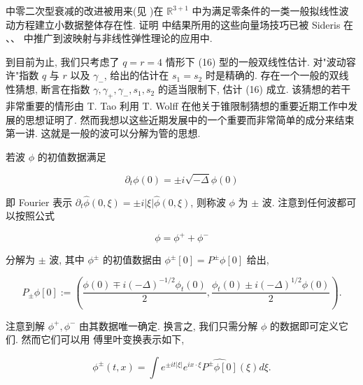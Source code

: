 \begin{remark}\label{rem:cG-1.24}
 中零二次型衰减的改进被用来(见 \cite{gfref28})在 $\mathbb{R}^{3 + 1}$ 中为满足零条件的一类一般拟线性波动方程建立小数据整体存在性. 证明 \cite{gfref28} 中结果所用的这些向量场技巧已被 Sideris 在 \cite{gfref63}、\cite{gfref64}、\cite{gfref65} 中推广到波映射与非线性弹性理论的应用中. 
\end{remark}

到目前为止, 我们只考虑了 $q = r = 4$ 情形下 (16) 型的一般双线性估计. 对"波动容许"指数 $q$ 与 $r$ 以及 $\gamma_{-}$,  给出的估计在 $s_{1} = s_{2}$ 时是精确的. 存在一个一般的双线性猜想, 断言在指数 $\gamma, \gamma_{+}, \gamma_{-}, s_{1}, s_{2}$ 的适当限制下, 估计 (16) 成立. 该猜想的若干非常重要的情形由 T. Tao \cite{gfref68} 利用 T. Wolff \cite{gfref76} 在他关于锥限制猜想的重要近期工作中发展的思想证明了. 然而我想以这些近期发展中的一个重要而非常简单的成分来结束第一讲. 这就是一般的波可以分解为管的思想. 

\begin{definition}\label{def:cG-1.25}
若波 $\phi$ 的初值数据满足

\[
\partial_ {t} \phi (0) = \pm i \sqrt {- \Delta} \phi (0)
\]

即 Fourier 表示 $\partial_t\widehat{\phi}(0, \xi) = \pm i|\xi |\widehat{\phi}(0, \xi)$, 则称波 $\phi$ 为 $\pm$ 波. 注意到任何波都可以按照公式

\[
\phi = \phi^ {+} + \phi^ {-}
\]

分解为 $\pm$ 波, 其中 $\phi^{\pm}$ 的初值数据由 $\phi^{\pm}[0] = P^{\pm}\phi [0]$ 给出, 

\[
P _ {\pm} \phi [ 0 ] := \left(\frac {\phi (0) \mp i (- \Delta) ^ {- 1 / 2} \phi_ {t} (0)}{2},  \frac {\phi_ {t} (0) \pm i (- \Delta) ^ {1 / 2} \phi (0)}{2}\right).
\]
\end{definition}

\begin{remark}\label{rem:cG-1.26}
注意到解 $\phi^{+},  \phi^{-}$ 由其数据唯一确定. 换言之, 我们只需分解 $\phi$ 的数据即可定义它们. 然而它们可以用 傅里叶变换表示如下, 

\begin{equation}
\phi^ {\pm} (t,  x) = \int e ^ {\pm i t | \xi |} e ^ {i x \cdot \xi} \widehat {P ^ {\pm} \phi [ 0 ]} (\xi) d \xi .\label{eq:cG-20}
\end{equation}
\end{remark}

